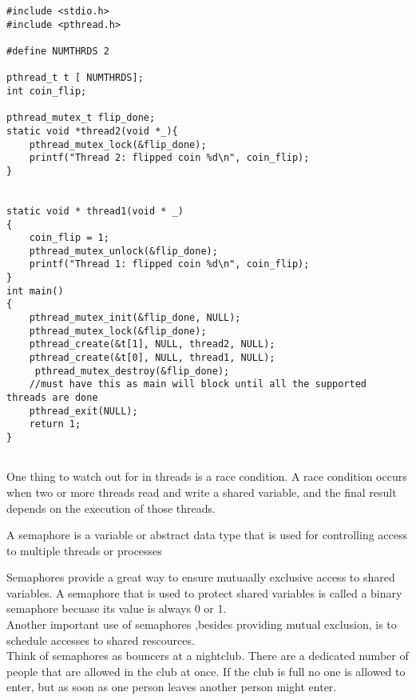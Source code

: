\begin{lstlisting}
#include <stdio.h>
#include <pthread.h>

#define NUMTHRDS 2

pthread_t t [ NUMTHRDS];
int coin_flip;

pthread_mutex_t flip_done;
static void *thread2(void *_){
	pthread_mutex_lock(&flip_done);
	printf("Thread 2: flipped coin %d\n", coin_flip);
}


static void * thread1(void * _)
{
	coin_flip = 1;
	pthread_mutex_unlock(&flip_done);
	printf("Thread 1: flipped coin %d\n", coin_flip);
}
int main()
{
	pthread_mutex_init(&flip_done, NULL);
	pthread_mutex_lock(&flip_done);
	pthread_create(&t[1], NULL, thread2, NULL);
	pthread_create(&t[0], NULL, thread1, NULL);
	 pthread_mutex_destroy(&flip_done);
	//must have this as main will block until all the supported threads are done
	pthread_exit(NULL);
	return 1;
}


\end{lstlisting}


One thing to watch out for in threads is a race condition.  A race condition occurs when two or more threads read and write a shared variable, and the final result depends on the execution of those threads.

A semaphore is a variable or abstract data type that is used for controlling access to multiple threads or processes

Semaphores provide a great way to ensure mutuaally exclusive access to shared variables.  A semaphore that is used to protect shared variables is called a binary semaphore becuase its value is always 0 or 1.\\

Another important use of semaphores ,besides providing mutual exclusion, is to schedule accesses to shared rescources.\\

Think of semaphores as bouncers at a nightclub. There are a dedicated number of people that are allowed in the club at once. If the club is full no one is allowed to enter, but as soon as one person leaves another person might enter.
